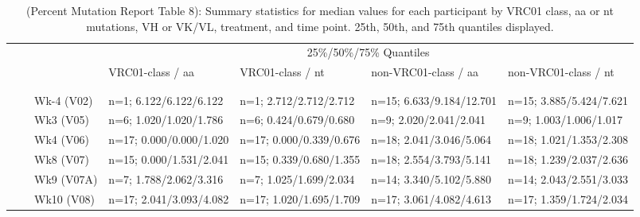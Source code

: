 \documentclass[
]{article}
\author{}
\date{\vspace{-2.5em}}
\begin{document}
\begin{table}[!h]

\caption[(Percent Mutation Report Table 8): Summary statistics for median values for each participant by VRC01 class, aa or nt mutations, VH or VK/VL, treatment, and time point]{\label{tab:percent-mut-tab-08}(Percent Mutation Report Table 8): Summary statistics for median values for each participant by VRC01 class, aa or nt mutations, VH or VK/VL, treatment, and time point. 25th, 50th, and 75th quantiles displayed.}
\centering
\fontsize{6}{8}\selectfont
\begin{tabular}[t]{lllllll}
\toprule
\multicolumn{3}{c}{ } & \multicolumn{4}{c}{25\%/50\%/75\% Quantiles} \\
\cmidrule(l{3pt}r{3pt}){4-7}
 &  &  & VRC01-class / aa & VRC01-class / nt & non-VRC01-class / aa & non-VRC01-class / nt\\
\midrule
\addlinespace[0.3em]
\multicolumn{7}{l}{\textbf{VH}}\\
\addlinespace[0.3em]
\multicolumn{7}{l}{\textit{20µg}}\\
\hspace{1em}\hspace{1em} &  & Wk-4 (V02) & n=1; 6.122/6.122/6.122 & n=1; 2.712/2.712/2.712 & n=15; 6.633/9.184/12.701 & n=15; 3.885/5.424/7.621\\
\cmidrule{3-7}
\hspace{1em}\hspace{1em} &  & Wk3 (V05) & n=6; 1.020/1.020/1.786 & n=6; 0.424/0.679/0.680 & n=9; 2.020/2.041/2.041 & n=9; 1.003/1.006/1.017\\
\cmidrule{3-7}
\hspace{1em}\hspace{1em} &  & Wk4 (V06) & n=17; 0.000/0.000/1.020 & n=17; 0.000/0.339/0.676 & n=18; 2.041/3.046/5.064 & n=18; 1.021/1.353/2.308\\
\cmidrule{3-7}
\hspace{1em}\hspace{1em} &  & Wk8 (V07) & n=15; 0.000/1.531/2.041 & n=15; 0.339/0.680/1.355 & n=18; 2.554/3.793/5.141 & n=18; 1.239/2.037/2.636\\
\cmidrule{3-7}
\hspace{1em}\hspace{1em} &  & Wk9 (V07A) & n=7; 1.788/2.062/3.316 & n=7; 1.025/1.699/2.034 & n=14; 3.340/5.102/5.880 & n=14; 2.043/2.551/3.033\\
\cmidrule{3-7}
\hspace{1em}\hspace{1em} &  & Wk10 (V08) & n=17; 2.041/3.093/4.082 & n=17; 1.020/1.695/1.709 & n=17; 3.061/4.082/4.613 & n=17; 1.359/1.724/2.034\\

\end{tabular}
\end{table}
\end{document}
